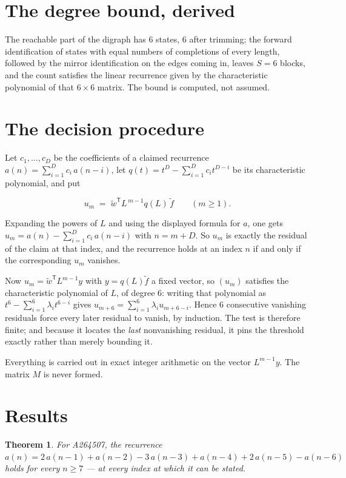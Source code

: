 \documentclass[11pt]{article}
\newtheorem{theorem}{Theorem}
\theoremstyle{definition}
\begin{document}
\section{The degree bound, derived}

The reachable part of the digraph has $6$ states, $6$ after trimming; the forward identification of states with equal numbers of completions of every length, followed by the mirror identification on the edges coming in, leaves $S = 6$ blocks, and the count satisfies the linear recurrence given by the characteristic polynomial of that $6\times6$ matrix. The bound is computed, not assumed.

\section{The decision procedure}

Let $c_1,\dots,c_D$ be the coefficients of a claimed recurrence $a(n) = \sum_{i=1}^{D} c_i\,a(n-i)$, let $q(t) = t^{D} - \sum_{i=1}^{D} c_i t^{D-i}$ be its characteristic polynomial, and put

\[u_m \;=\; \tilde w^{\mathsf T} L^{\,m-1} q(L)\,\tilde f \qquad (m \ge 1).\]

Expanding the powers of $L$ and using the displayed formula for $a$, one gets $u_m = a(n) - \sum_{i=1}^{D} c_i\,a(n-i)$ with $n = m + D$. So $u_m$ is exactly the residual of the claim at that index, and the recurrence holds at an index $n$ if and only if the corresponding $u_m$ vanishes.

Now $u_m = \tilde w^{\mathsf T} L^{m-1} y$ with $y = q(L)\tilde f$ a fixed vector, so $(u_m)$ satisfies the characteristic polynomial of $L$, of degree $6$: writing that polynomial as $t^{6} - \sum_{i=1}^{6} \lambda_i t^{6-i}$ gives $u_{m+6} = \sum_{i=1}^{6} \lambda_i u_{m+6-i}$. Hence $6$ consecutive vanishing residuals force every later residual to vanish, by induction. The test is therefore finite; and because it locates the {\itshape last} nonvanishing residual, it pins the threshold exactly rather than merely bounding it.

Everything is carried out in exact integer arithmetic on the vector $L^{m-1}y$. The matrix $M$ is never formed.

\section{Results}

\begin{theorem} For A264507, the recurrence $a(n) = 2\,a(n-1) + a(n-2) - 3\,a(n-3) + a(n-4) + 2\,a(n-5) - a(n-6)$ holds for every $n \ge 7$ --- at every index at which it can be stated.\end{theorem}
\end{document}
